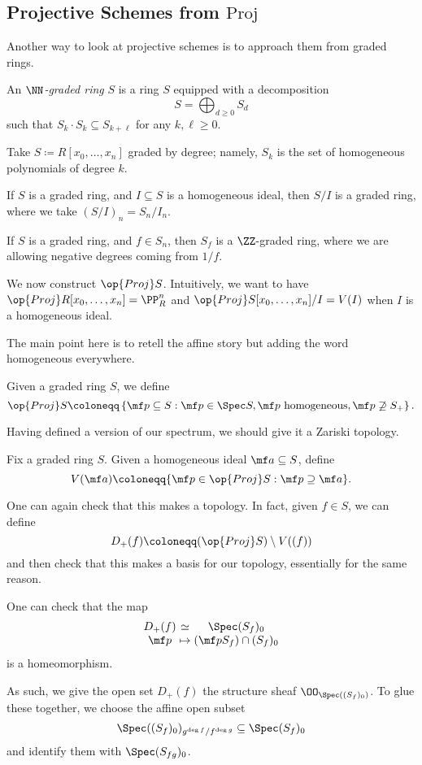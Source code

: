 \documentclass[../notes.tex]{subfiles}
\begin{document}
\subsection{Projective Schemes from \texorpdfstring{$\mathrm{Proj}$} {Proj}}
Another way to look at projective schemes is to approach them from graded rings.
\begin{definition}
	An \textit{$\NN$-graded ring} $S$ is a ring $S$ equipped with a decomposition
	\[S=\bigoplus_{d\ge0}S_d\]
	such that $S_k\cdot S_k\subseteq S_{k+\ell}$ for any $k,\ell\ge0$.
\end{definition}
\begin{example}
	Take $S\coloneqq R[x_0,\ldots,x_n]$ graded by degree; namely, $S_k$ is the set of homogeneous polynomials of degree $k$.
\end{example}
\begin{example}
	If $S$ is a graded ring, and $I\subseteq S$ is a homogeneous ideal, then $S/I$ is a graded ring, where we take $(S/I)_n=S_n/I_n$.
\end{example}
\begin{example}
	If $S$ is a graded ring, and $f\in S_n$, then $S_f$ is a $\ZZ$-graded ring, where we are allowing negative degrees coming from $1/f$.
\end{example}
We now construct $\op{Proj}S$. Intuitively, we want to have $\op{Proj}R[x_0,\ldots,x_n]=\PP^n_R$ and $\op{Proj}S[x_0,\ldots,x_n]/I=V(I)$ when $I$ is a homogeneous ideal.

The main point here is to retell the affine story but adding the word homogeneous everywhere.
\begin{defihelper} 
	Given a graded ring $S$, we define
	\[\op{Proj}S\coloneqq\left\{\mf p\subseteq S:\mf p\in\Spec S,\mf p\text{ homogeneous},\mf p\not\supseteq S_+\right\}.\]
\end{defihelper}
Having defined a version of our spectrum, we should give it a Zariski topology.
\begin{defihelper} 
	Fix a graded ring $S$. Given a homogeneous ideal $\mf a\subseteq S$, define
	\[V(\mf a)\coloneqq\{\mf p\in\op{Proj}S:\mf p\supseteq\mf a\}.\]
\end{defihelper}
One can again check that this makes a topology. In fact, given $f\in S$, we can define
\[D_+(f)\coloneqq(\op{Proj}S)\setminus V((f))\]
and then check that this makes a basis for our topology, essentially for the same reason.
\begin{remark}
	One can check that the map
	\[\arraycolsep=1.4pt\begin{array}{ccc}
		D_+(f) &\simeq& \Spec (S_f)_0 \\
		\mf p &\mapsto& (\mf pS_f)\cap(S_f)_0
	\end{array}\]
	is a homeomorphism.
\end{remark}
As such, we give the open set $D_+(f)$ the structure sheaf $\OO_{\Spec((S_f)_0)}$. To glue these together, we choose the affine open subset
\[\Spec((S_f)_0)_{g^{\deg f}/f^{\deg g}}\subseteq\Spec(S_f)_0\]
and identify them with $\Spec(S_{fg})_0$.
\end{document}

